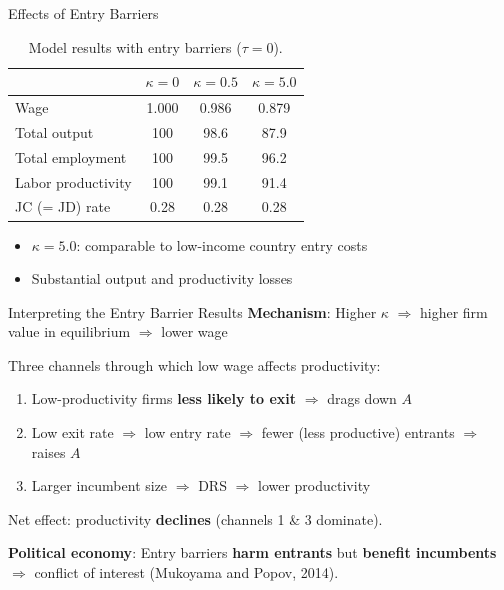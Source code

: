 \documentclass[blue]{beamer}
\begin{document}
\begin{frame}{Effects of Entry Barriers}
	\begin{table}
		\centering
		\begin{tabular}{lccc}
			\toprule
			& $\kappa = 0$ & $\kappa = 0.5$ & $\kappa = 5.0$ \\
			\midrule
			Wage & 1.000 & 0.986 & 0.879 \\
			Total output & 100 & 98.6 & 87.9 \\
			Total employment & 100 & 99.5 & 96.2 \\
			Labor productivity & 100 & 99.1 & 91.4 \\
			JC (= JD) rate & 0.28 & 0.28 & 0.28 \\
			\bottomrule
		\end{tabular}
		\caption{Model results with entry barriers ($\tau = 0$).}
	\end{table}
	
	\begin{itemize}
		\item $\kappa = 5.0$: comparable to low-income country entry costs 
		\item Substantial output and productivity losses
	\end{itemize}
\end{frame}

\begin{frame}{Interpreting the Entry Barrier Results}
	\textbf{Mechanism}: Higher $\kappa$ $\Rightarrow$ higher firm value in equilibrium $\Rightarrow$ lower wage
	
	\bigskip
	Three channels through which low wage affects productivity:
	\begin{enumerate}
		\item Low-productivity firms \textbf{less likely to exit} $\Rightarrow$ drags down $A$ \quad {\color{red}$\downarrow$}
		\item Low exit rate $\Rightarrow$ low entry rate $\Rightarrow$ fewer (less productive) entrants $\Rightarrow$ raises $A$ \quad {\color{blue}$\uparrow$}
		\item Larger incumbent size $\Rightarrow$ DRS $\Rightarrow$ lower productivity \quad {\color{red}$\downarrow$}
	\end{enumerate}
	
	\bigskip
	Net effect: productivity \textbf{declines} (channels 1 \& 3 dominate).
	
	\bigskip
	\textbf{Political economy}: Entry barriers \textbf{harm entrants} but \textbf{benefit incumbents} $\Rightarrow$ conflict of interest (Mukoyama and Popov, 2014).
\end{frame}
\end{document}
